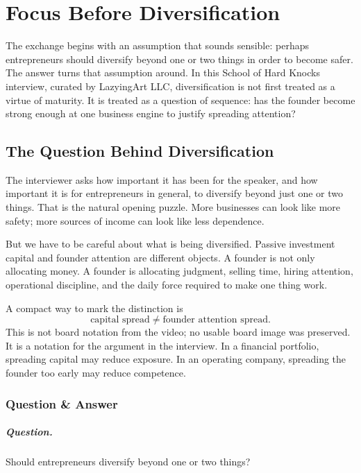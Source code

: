 \chapter{Focus Before Diversification}

The exchange begins with an assumption that sounds sensible: perhaps entrepreneurs should diversify beyond one or two things in order to become safer. The answer turns that assumption around. In this School of Hard Knocks interview, curated by LazyingArt LLC, diversification is not first treated as a virtue of maturity. It is treated as a question of sequence: has the founder become strong enough at one business engine to justify spreading attention?

\section{The Question Behind Diversification}

The interviewer asks how important it has been for the speaker, and how important it is for entrepreneurs in general, to diversify beyond just one or two things. That is the natural opening puzzle. More businesses can look like more safety; more sources of income can look like less dependence.

But we have to be careful about what is being diversified. Passive investment capital and founder attention are different objects. A founder is not only allocating money. A founder is allocating judgment, selling time, hiring attention, operational discipline, and the daily force required to make one thing work.

A compact way to mark the distinction is
\begin{equation}
\text{capital spread}
\neq
\text{founder attention spread}.
\end{equation}
This is not board notation from the video; no usable board image was preserved. It is a notation for the argument in the interview. In a financial portfolio, spreading capital may reduce exposure. In an operating company, spreading the founder too early may reduce competence.

\subsection{Question \& Answer}

\paragraph{Question.}
Should entrepreneurs diversify beyond one or two things?

